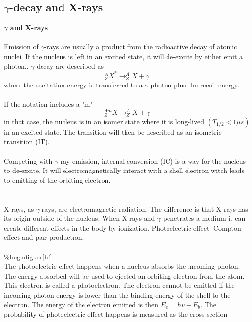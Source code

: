 \documentclass[twoside,english]{uiofysmaster/uiofysmaster}
\begin{document}
\subsection{$\gamma$-decay and X-rays}

\textbf{$\gamma$ and X-rays}\\
\\
\noindent
Emission of $\gamma$-rays are usually a product from the radioactive decay of atomic nuclei. If the nucleus is left in an excited state, it will de-excite by either emit a photon.\cite{nuclearchem}. $\gamma$ decay are described as $$^{A}_{Z}X^* \rightarrow ^{A}_ZX + \gamma$$
where the excitation energy is transferred to a $\gamma$ photon plus the recoil energy.\\
\\
If the notation includes a "m" $$^{Am}_ZX \rightarrow ^{A}_ZX + \gamma$$
in that case, the nucleus is in an isomer state where it is long-lived $(T_{1/2} < 1 \mu s)$ in an excited state\cite{nuclearchem}. The transition will then be described as an isometric transition (IT).\\
\\
Competing with $\gamma$-ray emission, internal conversion (IC) is a way for the nucleus to de-excite. It will electromagnetically interact with a shell electron witch leads to emitting of the orbiting electron\cite{toxicology}.\\
\\
\\  
X-rays, as $\gamma$-rays, are electromagnetic radiation. The difference is that X-rays has its origin outside of the nucleus. When X-rays and $\gamma$ penetrates a medium it can create different effects in the body by ionization.
Photoelectric effect, Compton effect and pair production. \\
\\
\%begin{figure}[h!]
\\
The photoelectric effect happens when a nucleus absorbs the incoming photon. The energy absorbed will be used to ejected an orbiting electron from the atom. This electron is called a photoelectron\cite{nuclearchem}. The electron cannot be emitted if the incoming photon energy is lower than the binding energy of the shell to the electron. The energy of the electron emitted is then $E_e = hv - E_b$. The probability of photoelectric effect happens is measured as the cross section 
\end{document}
